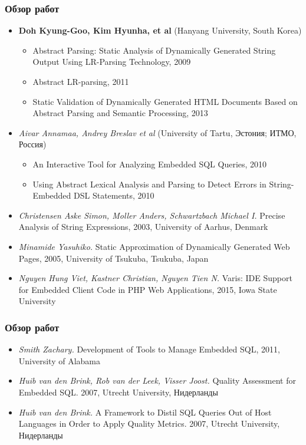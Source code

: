 \documentclass{beamer}
\begin{document}
\begin{frame}
    \transwipe[direction=90]
    \frametitle{Обзор работ}
    \begin{itemize}
        \item \textbf{Doh Kyung-Goo, Kim Hyunha, et al} {\small{(Hanyang University, South Korea)}}
        \begin{itemize}
            \item Abstract Parsing: Static Analysis of Dynamically Generated String Output Using LR-Parsing Technology, 2009
            \item Abstract LR-parsing, 2011
            \item Static Validation of Dynamically Generated HTML Documents Based on Abstract Parsing and Semantic Processing, 2013
        \end{itemize}
        \item \textit{Aivar Annamaa, Andrey Breslav et al} (University of Tartu, Эстония; ИТМО, Россия)
        \begin{itemize}
            \item An Interactive Tool for Analyzing Embedded SQL Queries, 2010
            \item Using Abstract Lexical Analysis and Parsing to Detect Errors in String-Embedded DSL Statements, 2010
        \end{itemize}
        \item \textit{Christensen Aske Simon, Moller Anders, Schwartzbach Michael I.} Precise Analysis of String Expressions, 2003, University of Aarhus, Denmark
        \item \textit{Minamide Yasuhiko.} Static Approximation of Dynamically Generated Web Pages, 2005, University of Tsukuba, Tsukuba, Japan
        \item \textit{Nguyen Hung Viet, Kastner Christian, Nguyen Tien N.} Varis: IDE Support for Embedded Client Code in PHP Web Applications, 2015, Iowa State University
    \end{itemize}
\end{frame}

\begin{frame}
    \transwipe[direction=90]
    \frametitle{Обзор работ}
    \begin{itemize}
        \item \textit{Smith Zachary.} Development of Tools to Manage Embedded SQL,  2011, University of Alabama
        \item \textit{Huib van den Brink, Rob van der Leek, Visser Joost.} Quality Assessment for Embedded SQL. 2007, Utrecht University, Нидерланды
        \item \textit{Huib van den Brink.} A Framework to Distil SQL Queries Out of Host Languages in Order to Apply Quality Metrics.  2007, Utrecht University, Нидерланды
    \end{itemize}
\end{frame}
\end{document}
